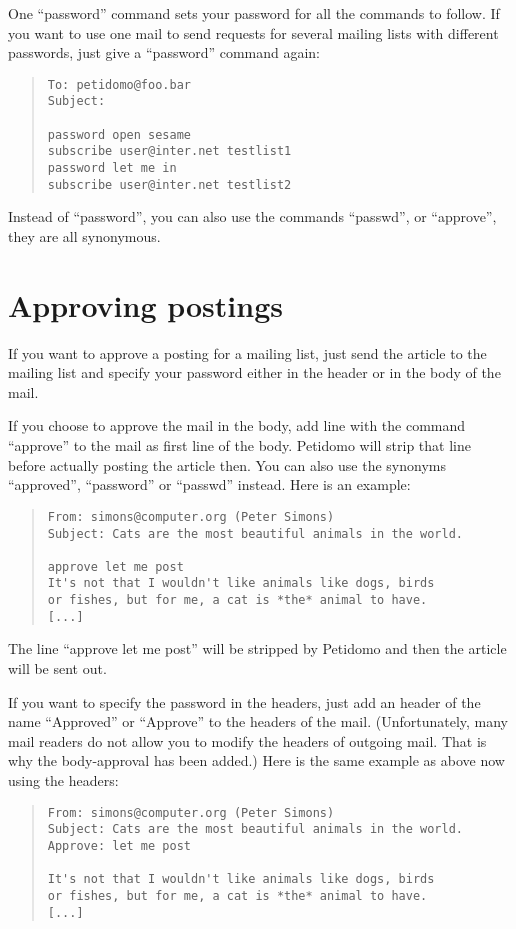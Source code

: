 \documentclass[a4paper,10pt]{scrreprt}
\begin{document}
One ``password'' command sets your password for all the commands to
follow. If you want to use one mail to send requests for several
mailing lists with different passwords, just give a ``password''
command again:
\begin{quote}
\begin{verbatim}
To: petidomo@foo.bar
Subject:

password open sesame
subscribe user@inter.net testlist1
password let me in
subscribe user@inter.net testlist2
\end{verbatim}
\end{quote}

Instead of ``password'', you can also use the commands ``passwd'', or
``approve'', they are all synonymous.

\section{Approving postings}

If you want to approve a posting for a mailing list, just send the
article to the mailing list and specify your password either in the
header or in the body of the mail.

If you choose to approve the mail in the body, add line with the
command ``approve'' to the mail as first line of the body. Petidomo
will strip that line before actually posting the article then. You can
also use the synonyms ``approved'', ``password'' or ``passwd''
instead. Here is an example:
\begin{quote}
\begin{verbatim}
From: simons@computer.org (Peter Simons)
Subject: Cats are the most beautiful animals in the world.

approve let me post
It's not that I wouldn't like animals like dogs, birds
or fishes, but for me, a cat is *the* animal to have.
[...]
\end{verbatim}
\end{quote}

The line ``approve let me post'' will be stripped by Petidomo and
then the article will be sent out.

If you want to specify the password in the headers, just add an header
of the name ``Approved'' or ``Approve'' to the headers of the mail.
(Unfortunately, many mail readers do not allow you to modify the
headers of outgoing mail. That is why the body-approval has been
added.) Here is the same example as above now using the headers:
\begin{quote}
\begin{verbatim}
From: simons@computer.org (Peter Simons)
Subject: Cats are the most beautiful animals in the world.
Approve: let me post

It's not that I wouldn't like animals like dogs, birds
or fishes, but for me, a cat is *the* animal to have.
[...]
\end{verbatim}
\end{quote}
\end{document}
